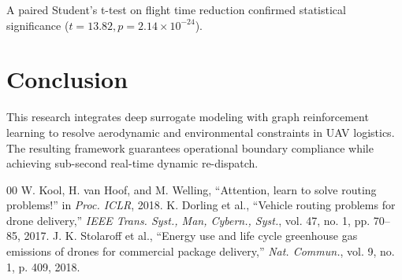 \documentclass[conference]{IEEEtran}
\begin{document}
A paired Student's t-test on flight time reduction confirmed statistical significance ($t = 13.82, p = 2.14 \times 10^{-24}$).

\section{Conclusion}
This research integrates deep surrogate modeling with graph reinforcement learning to resolve aerodynamic and environmental constraints in UAV logistics. The resulting framework guarantees operational boundary compliance while achieving sub-second real-time dynamic re-dispatch.

\begin{thebibliography}{00}
 W. Kool, H. van Hoof, and M. Welling, ``Attention, learn to solve routing problems!'' in \textit{Proc. ICLR}, 2018.
 K. Dorling et al., ``Vehicle routing problems for drone delivery,'' \textit{IEEE Trans. Syst., Man, Cybern., Syst.}, vol. 47, no. 1, pp. 70--85, 2017.
 J. K. Stolaroff et al., ``Energy use and life cycle greenhouse gas emissions of drones for commercial package delivery,'' \textit{Nat. Commun.}, vol. 9, no. 1, p. 409, 2018.
\end{thebibliography}
\end{document}
